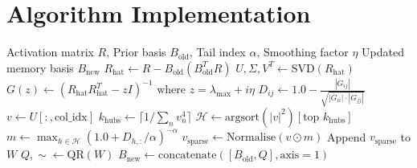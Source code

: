 \documentclass[10pt,a4paper]{article}
\begin{document}
	\section{Algorithm Implementation}
	\begin{algorithm}
		\caption{Heavy-Tailed Gradient Projection Method (HTGPM)}\label{alg:htgpm}
		\begin{algorithmic}[1]
			\Require Activation matrix $R$, Prior basis $B_{\text{old}}$, Tail index $\alpha$, Smoothing factor $\eta$
			\Ensure Updated memory basis $B_{\text{new}}$
			\Statex
			\State $R_{\text{hat}} \gets R - B_{\text{old}}(B_{\text{old}}^T R)$ 
			\State $U, \Sigma, V^T \gets \text{SVD}(R_{\text{hat}})$ 
			\Statex 
			\State $G(z) \gets (R_{\text{hat}}R_{\text{hat}}^T - zI)^{-1} \text{ where } z = \lambda_{\text{max}} + i\eta$ 
			\State $D_{ij} \gets 1.0 - \frac{|G_{ij}|}{\sqrt{|G_{ii}| \cdot |G_{jj}|}}$ 
			\Statex
			\State $v \gets U[:, \text{col\_idx}]$
			\State $k_{\text{hubs}} \gets \lceil 1 / \sum_{n} v_n^4 \rceil$ 
			\State $\mathcal{H} \gets \text{argsort}(|v|^2)[\text{top } k_{\mathrm{hubs}}]$ 
			\Statex
			\State $m \gets \max_{h \in \mathcal{H}} \left( 1.0 + D_{h, :} / \alpha \right)^{-\alpha}$ 
			\State $v_{\text{sparse}} \gets \mathrm{Normalise}(v \odot m)$ 
			\State Append $v_{\text{sparse}}$ to $W$
			\EndFor  %
			\Statex
			\State $Q, \sim \gets \text{QR}(W)$ 
			\State \Return $B_{\text{new}} \gets \mathrm{concatenate}([B_{\text{old}}, Q], \mathrm{axis}=1)$
		\end{algorithmic}
	\end{algorithm}
\end{document}

